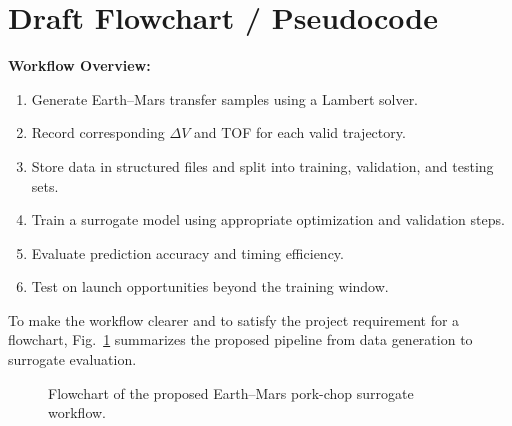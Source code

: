 \documentclass[conference]{IEEEtran}
\begin{document}
	\section{Draft Flowchart / Pseudocode}
	\textbf{Workflow Overview:}
	\begin{enumerate}
		\item Generate Earth--Mars transfer samples using a Lambert solver.
		\item Record corresponding $\Delta V$ and TOF for each valid trajectory.
		\item Store data in structured files and split into training, validation, and testing sets.
		\item Train a surrogate model using appropriate optimization and validation steps.
		\item Evaluate prediction accuracy and timing efficiency.
		\item Test on launch opportunities beyond the training window.
	\end{enumerate}
	
	To make the workflow clearer and to satisfy the project requirement for a flowchart, Fig.~\ref{fig:flowchart} summarizes the proposed pipeline from data generation to surrogate evaluation.
	
\begin{figure}[h]
	\centering
	\scriptsize
	\caption{Flowchart of the proposed Earth--Mars pork-chop surrogate workflow.}
	\label{fig:flowchart}
\end{figure}
\end{document}
